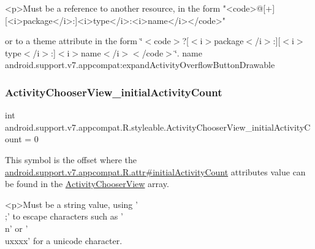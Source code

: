 \begin{DoxyVerb}      <p>Must be a reference to another resource, in the form "<code>@[+][<i>package</i>:]<i>type</i>:<i>name</i></code>"
\end{DoxyVerb}
 or to a theme attribute in the form \char`\"{}$<$code$>$?\mbox{[}$<$i$>$package$<$/i$>$\+:\mbox{]}\mbox{[}$<$i$>$type$<$/i$>$\+:\mbox{]}$<$i$>$name$<$/i$>$$<$/code$>$\char`\"{}.  name android.\+support.\+v7.\+appcompat\+:expand\+Activity\+Overflow\+Button\+Drawable \mbox{\label{classandroid_1_1support_1_1v7_1_1appcompat_1_1R_1_1styleable_ab6826b784285f4584f4c664422674559}} 
\subsubsection{\texorpdfstring{Activity\+Chooser\+View\+\_\+initial\+Activity\+Count}{ActivityChooserView\_initialActivityCount}}
{\footnotesize\ttfamily int android.\+support.\+v7.\+appcompat.\+R.\+styleable.\+Activity\+Chooser\+View\+\_\+initial\+Activity\+Count = 0\hspace{0.3cm}{\ttfamily [static]}}

This symbol is the offset where the \hyperlink{classandroid_1_1support_1_1v7_1_1appcompat_1_1R_1_1attr_a05bd79550a679c584b4c3cddd8a08c7f}{android.\+support.\+v7.\+appcompat.\+R.\+attr\#initial\+Activity\+Count} attribute\textquotesingle{}s value can be found in the \hyperlink{classandroid_1_1support_1_1v7_1_1appcompat_1_1R_1_1styleable_a982c115fab0715899d54b7816a21cc47}{Activity\+Chooser\+View} array.

\begin{DoxyVerb}      <p>Must be a string value, using '\\;' to escape characters such as '\\n' or '\\uxxxx' for a unicode character.
\end{DoxyVerb}
 

